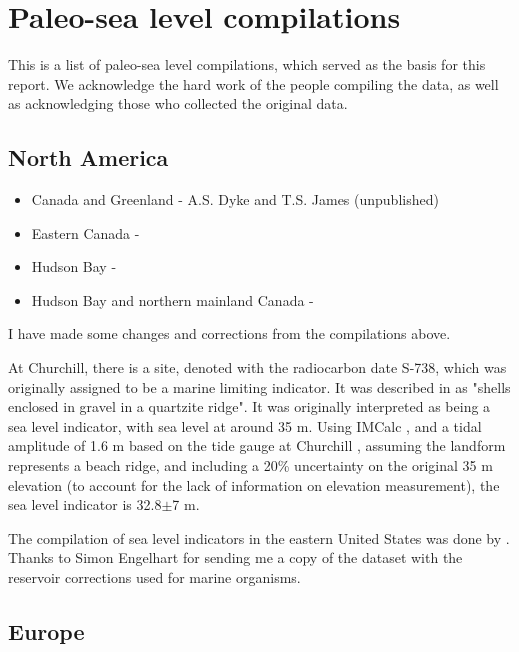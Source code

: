 \section{Paleo-sea level compilations}

This is a list of paleo-sea level compilations, which served as the basis for this report. We acknowledge the hard work of the people compiling the data, as well as acknowledging those who collected the original data.

\subsection{North America}

\begin{itemize}
  \item Canada and Greenland - A.S. Dyke and T.S. James (unpublished)
  \item Eastern Canada - \citet{VacchiEtal2018}
  \item Hudson Bay - \citet{SimonEtal2016}
  \item Hudson Bay and northern mainland Canada - \citet{GowanEtal2016}
\end{itemize}

I have made some changes and corrections from the compilations above.

At Churchill, there is a site, denoted with the radiocarbon date S-738, which was originally assigned to be a marine limiting indicator. It was described in \citet{MorlanEtal2000} as "shells enclosed in gravel in a quartzite ridge". It was originally interpreted as being a sea level indicator, with sea level at around 35 m. Using IMCalc  \citep{LorscheidRovere2019}, and a tidal amplitude of 1.6 m based on the tide gauge at Churchill \citep{Ray2016}, assuming the landform represents a beach ridge, and including a 20\% uncertainty on the original 35 m elevation (to account for the lack of information on elevation measurement), the sea level indicator is 32.8$\pm$7 m.

The compilation of sea level indicators in the eastern United States was done by \citet{EngelhartHorton2012}. Thanks to Simon Engelhart for sending me a copy of the dataset with the reservoir corrections used for marine organisms.

\subsection{Europe}

\label{sec:Europe}

